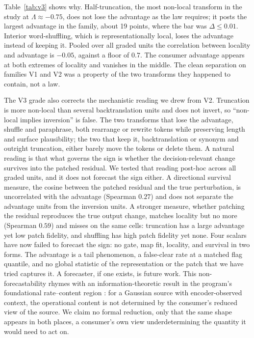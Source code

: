 \documentclass[11pt]{article}
\begin{document}
Table~\ref{tab:v3} shows why. Half-truncation, the most non-local transform in
the study at $\Lambda \approx -0.75$, does not lose the advantage as the law
requires; it posts the largest advantage in the family, about 19 points, where
the bar was $\Delta \le 0.01$. Interior word-shuffling, which is
representationally local, loses the advantage instead of keeping it. Pooled over
all graded units the correlation between locality and advantage is $-0.05$,
against a floor of $0.7$. The consumer advantage appears at both extremes of
locality and vanishes in the middle. The clean separation on families V1 and V2
was a property of the two transforms they happened to contain, not a law.

The V3 grade also corrects the mechanistic reading we drew from V2. Truncation
is more non-local than several backtranslation units and does not invert, so
``non-local implies inversion'' is false. The two transforms that lose the
advantage, shuffle and paraphrase, both rearrange or rewrite tokens while
preserving length and surface plausibility; the two that keep it, backtranslation
or synonym and outright truncation, either barely move the tokens or delete them.
A natural reading is that what governs the sign is whether the decision-relevant
change survives into the patched residual. We tested that reading post-hoc across
all graded units, and it does not forecast the sign either. A directional
survival measure, the cosine between the patched residual and the true
perturbation, is uncorrelated with the advantage (Spearman $0.27$) and does not
separate the advantage units from the inversion units. A stronger measure,
whether patching the residual reproduces the true output change, matches locality
but no more (Spearman $0.59$) and misses on the same cells: truncation has a
large advantage yet low patch fidelity, and shuffling has high patch fidelity yet
none. Four scalars have now failed to forecast the sign: no gate, map fit,
locality, and survival in two forms. The advantage is a tail phenomenon, a
false-clear rate at a matched flag quantile, and no global statistic of the
representation or the patch that we have tried captures it. A forecaster, if one
exists, is future work. This non-forecastability rhymes with an
information-theoretic result in the program's foundational rate--content region
\cite{bondtit}: for a Gaussian source with encoder-observed context, the
operational content is not determined by the consumer's reduced view of the
source. We claim no formal reduction, only that the same shape appears in both
places, a consumer's own view underdetermining the quantity it would need to act
on.
\end{document}

